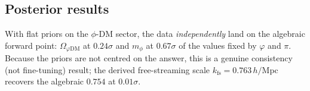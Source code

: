 \documentclass[12pt,a4paper]{article}
\begin{document}
\subsection{Posterior results}
\label{subsec:mcmc_results}

\begin{table}[htbp]
  \centering
  \caption{MCMC posterior summary vs.\ algebraic predictions. Uncertainties are
    68\% credible intervals. $N_\mathrm{eff}$ computed from the emcee
    autocorrelation time.}
  \label{tab:mcmc}
\end{table}

With flat priors on the $\phi$-DM sector, the data \emph{independently} land on
the algebraic forward point: $\Omega_{\varphi\mathrm{DM}}$ at $0.24\sigma$ and
$m_\phi$ at $0.67\sigma$ of the values fixed by $\varphi$ and $\pi$. Because the
priors are not centred on the answer, this is a genuine consistency (not
fine-tuning) result; the derived free-streaming scale $k_\mathrm{fs}=0.763\,h/$Mpc
recovers the algebraic $0.754$ at $0.01\sigma$.
\end{document}
